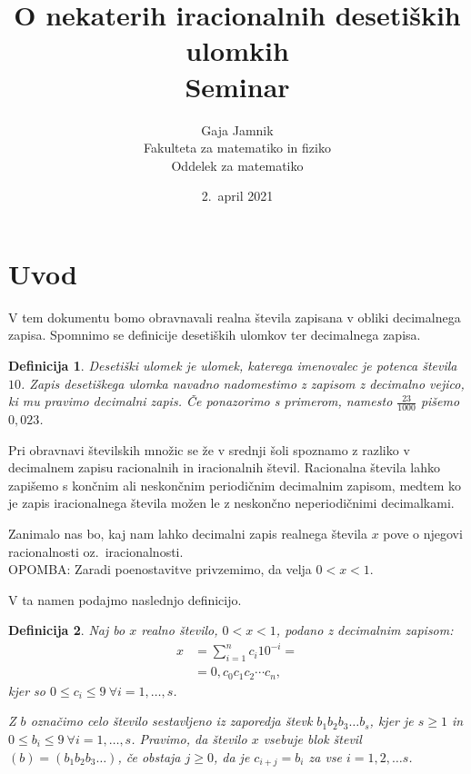 \documentclass[a4paper,12pt]{article}
\title{O nekaterih iracionalnih desetiških ulomkih \\ 
\Large Seminar}
\author{Gaja Jamnik \\
Fakulteta za matematiko in fiziko \\
Oddelek za matematiko}
\date{2.\ april 2021}
\newtheorem{definicija}{Definicija}
\begin{document}


\maketitle



\section{Uvod}
V tem dokumentu bomo obravnavali realna števila zapisana v obliki decimalnega zapisa.
Spomnimo se definicije desetiških ulomkov ter decimalnega zapisa.

\begin{definicija}
    {\em Desetiški ulomek} je ulomek, katerega imenovalec je potenca števila $10$. Zapis desetiškega ulomka navadno
    nadomestimo z zapisom z decimalno vejico, ki mu pravimo {\em decimalni zapis}. Če ponazorimo s primerom, namesto 
    $ \frac{23}{1000}$ pišemo $0,023$.
\end{definicija}

Pri obravnavi številskih množic se že v srednji šoli spoznamo z razliko v decimalnem zapisu
racionalnih in iracionalnih števil. Racionalna števila lahko zapišemo
s končnim ali neskončnim periodičnim decimalnim zapisom, medtem ko je zapis iracionalnega števila možen 
le z neskončno neperiodičnimi decimalkami.

Zanimalo nas bo, kaj nam lahko decimalni zapis realnega števila $x$ pove o njegovi racionalnosti
oz.\ iracionalnosti. \\
OPOMBA: Zaradi poenostavitve privzemimo, da velja $ 0 < x < 1$.


V ta namen podajmo naslednjo definicijo.

\begin{definicija}
    \label{defincija blokov}
    Naj bo $x$ realno število, $ 0 < x < 1$, podano z decimalnim zapisom: 
    \[ 
        \begin{split}
            x & = \sum^n_{i=1} c_i 10^{-i} = \\
            & = 0,c_0c_1c_2 \cdots c_n ,
        \end{split}   
    \]
    kjer so $0 \leq c_i \leq 9 \ \forall i = 1, \dots, s$.
    
    Z $b$ označimo celo število sestavljeno iz zaporedja števk
    $b_1b_2b_3 \dots b_s$, 
    kjer je $s\geq 1$ in $0 \leq b_i \leq 9 \ \forall i = 1, \dots, s$.
    Pravimo, da število $x$ {\em vsebuje blok števil $(b) = (b_1b_2b_3 \dots)$}, če obstaja $j \geq 0$, da je 
    $c_{i+j} = b_i$ za vse $i=1, 2, \dots s$.
\end{definicija}
\end{document}
